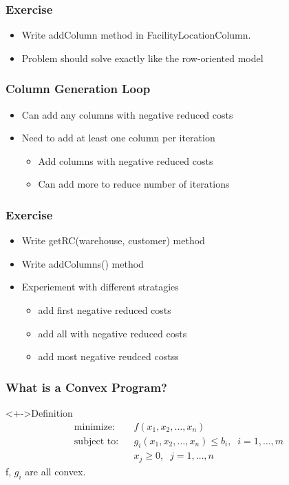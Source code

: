 \documentclass[12pt,handout]{beamer}
\begin{document}
\begin{frame}
  \frametitle{Exercise}
  \begin{itemize}
    \item Write addColumn method in FacilityLocationColumn.
    \item Problem should solve exactly like the row-oriented model
  \end{itemize}
\end{frame}

\begin{frame}
  \frametitle{Column Generation Loop}
  \begin{itemize}
  \item Can add any columns with negative reduced costs
  \item Need to add at least one column per iteration
    \begin{itemize}
    \item Add columns with negative reduced costs
    \item Can add more to reduce number of iterations
    \end{itemize}
  \end{itemize}
\end{frame}

\begin{frame}
  \frametitle{Exercise}
  \begin{itemize}
    \item Write getRC(warehouse, customer) method
    \item Write addColumns() method
    \item Experiement with different stratagies
      \begin{itemize}
        \item add first negative reduced costs
        \item add all with negative reduced costs
        \item add most negative reudced costss
      \end{itemize}
  \end{itemize}
\end{frame}


\begin{frame}
\frametitle{What is a Convex Program?}
\begin{block}<+->{Definition}
\begin{eqnarray}
\mbox{minimize:} && f(x_1, x_2, \ldots, x_n) \nonumber \\
\mbox{subject to:} && g_i(x_1, x_2, \ldots, x_n) \le b_i, \;\; i = 1, \ldots, m \nonumber \\
&& x_j \ge 0,\;\;j = 1, \ldots, n \nonumber
\end{eqnarray}
f, $g_i$ are all convex.
\end{block}
\end{frame}
\end{document}
